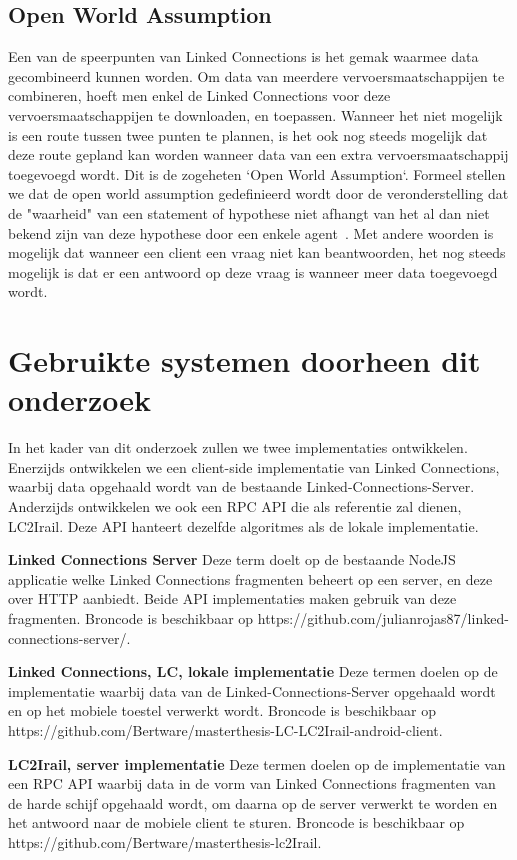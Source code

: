 \subsection{Open World Assumption}
Een van de speerpunten van Linked Connections is het gemak waarmee data gecombineerd kunnen worden. Om data van meerdere vervoersmaatschappijen te combineren, hoeft men enkel de Linked Connections voor deze vervoersmaatschappijen te downloaden, en  toepassen. Wanneer het niet mogelijk is een route tussen twee punten te plannen, is het ook nog steeds mogelijk dat deze route gepland kan worden wanneer data van een extra vervoersmaatschappij toegevoegd wordt. Dit is de zogeheten `Open World Assumption`. Formeel stellen we dat de open world assumption gedefinieerd wordt door de veronderstelling dat de "waarheid" van een statement of hypothese niet afhangt van het al dan niet bekend zijn van deze hypothese door een enkele agent~\citep{Moore15}. Met andere woorden is mogelijk dat wanneer een client een vraag niet kan beantwoorden, het nog steeds mogelijk is dat er een antwoord op deze vraag is wanneer meer data toegevoegd wordt.


\section{Gebruikte systemen doorheen dit onderzoek}
In het kader van dit onderzoek zullen we twee implementaties ontwikkelen. Enerzijds ontwikkelen we een client-side implementatie van Linked Connections, waarbij data opgehaald wordt van de bestaande Linked-Connections-Server. Anderzijds ontwikkelen we ook een RPC API die als referentie zal dienen, LC2Irail. Deze API hanteert dezelfde algoritmes als de lokale implementatie.

\textbf{Linked Connections Server} Deze term doelt op de bestaande NodeJS applicatie welke Linked Connections fragmenten beheert op een server, en deze over HTTP aanbiedt. Beide API implementaties maken gebruik van deze fragmenten. Broncode is beschikbaar op https://github.com/julianrojas87/linked-connections-server/.

\textbf{Linked Connections, LC, lokale implementatie} Deze termen doelen op de implementatie waarbij data van de Linked-Connections-Server opgehaald wordt en op het mobiele toestel verwerkt wordt. Broncode is beschikbaar op https://github.com/Bertware/masterthesis-LC-LC2Irail-android-client.

\textbf{LC2Irail, server implementatie} Deze termen doelen op de implementatie van een RPC API waarbij data in de vorm van Linked Connections fragmenten van de harde schijf opgehaald wordt, om daarna op de server verwerkt te worden en het antwoord naar de mobiele client te sturen. Broncode is beschikbaar op https://github.com/Bertware/masterthesis-lc2Irail.

